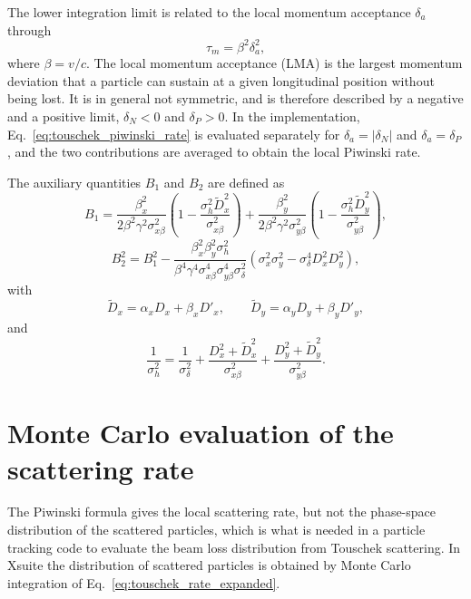 The lower integration limit is related to the local momentum acceptance
$\delta_a$ through
\begin{equation}
    \tau_m = \beta^2 \delta_a^2 ,
    \label{eq:touschek_taum}
\end{equation}
where $\beta = v/c$. The local momentum acceptance (LMA) is the largest momentum
deviation that a particle can sustain at a given longitudinal position without
being lost. It is in general not symmetric, and is therefore described by a
negative and a positive limit, $\delta_N < 0$ and $\delta_P > 0$.
In the implementation, Eq.~\eqref{eq:touschek_piwinski_rate} is evaluated
separately for $\delta_a = |\delta_N|$ and $\delta_a = \delta_P$, and the two
contributions are averaged to obtain the local Piwinski rate.

The auxiliary quantities $B_1$ and $B_2$ are defined as
\begin{equation}
    B_1 =
    \frac{\beta_x^2}{2\beta^2\gamma^2\sigma_{x\beta}^2}
    \left( 1 - \frac{\sigma_h^2 \widetilde{D}_x^2}{\sigma_{x\beta}^2} \right)
    + \frac{\beta_y^2}{2\beta^2\gamma^2\sigma_{y\beta}^2}
    \left( 1 - \frac{\sigma_h^2 \widetilde{D}_y^2}{\sigma_{y\beta}^2} \right) ,
    \label{eq:touschek_B1}
\end{equation}
\begin{equation}
    B_2^2 = B_1^2 -
    \frac{\beta_x^2 \beta_y^2 \sigma_h^2}
         {\beta^4\gamma^4 \sigma_{x\beta}^4 \sigma_{y\beta}^4 \sigma_\delta^2}
         \left(\sigma_x^2 \sigma_y^2 - \sigma_\delta^4 D_x^2 D_y^2\right) ,
    \label{eq:touschek_B2}
\end{equation}
with
\begin{equation}
    \widetilde{D}_x = \alpha_x D_x + \beta_x D'_x ,
    \qquad
    \widetilde{D}_y = \alpha_y D_y + \beta_y D'_y ,
    \label{eq:touschek_Dtilde}
\end{equation}
and
\begin{equation}
    \frac{1}{\sigma_h^2} =
    \frac{1}{\sigma_\delta^2} +
    \frac{D_x^2 + \widetilde{D}_x^2}{\sigma_{x\beta}^2} +
    \frac{D_y^2 + \widetilde{D}_y^2}{\sigma_{y\beta}^2} .
    \label{eq:touschek_sigmah}
\end{equation}

\section{Monte Carlo evaluation of the scattering rate}
\label{section:touschek_montecarlo}

The Piwinski formula gives the local scattering rate, but not the phase-space
distribution of the scattered particles, which is what is needed in a particle
tracking code to evaluate the beam loss distribution from Touschek scattering.
In Xsuite the distribution of scattered particles is obtained
by Monte Carlo integration of Eq.~\eqref{eq:touschek_rate_expanded}.

